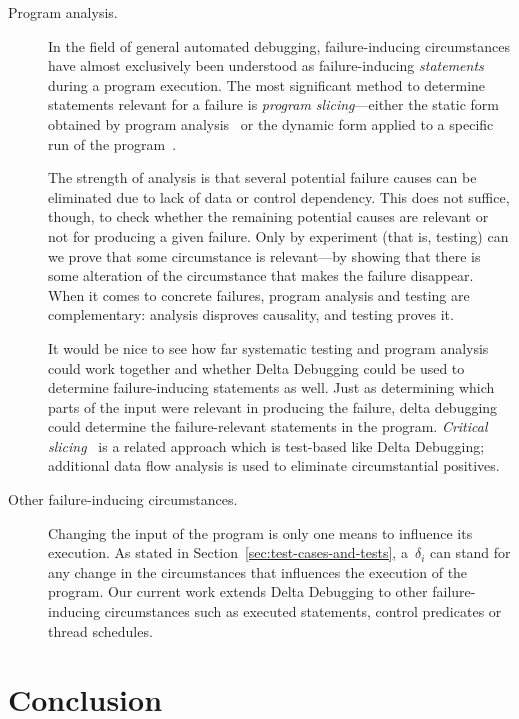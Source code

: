 \documentclass{acm_proc_article-sp}
\theoremstyle{plain}
\begin{document}
\begin{description}
\item[Program analysis.]  In the field of general automated debugging,
  failure-inducing circumstances have almost exclusively been
  understood as failure-inducing \emph{statements} during a program
  execution.  The most significant method to determine statements
  relevant for a failure is \emph{program slicing}---either the static
  form obtained by program analysis~\cite{weiser/82/cacm, tip/95/jpl}
  or the dynamic form applied to a specific run of the
  program~\cite{agrawal/horgan/90/pldi, gyimothy/etal/99/esec}.

  The strength of analysis is that several potential failure causes
  can be eliminated due to lack of data or control dependency.  This
  does not suffice, though, to check whether the remaining potential
  causes are relevant or not for producing a given failure.  Only by
  experiment (that is, testing) can we prove that some circumstance is
  relevant---by showing that there is some alteration of the
  circumstance that makes the failure disappear.  When it comes to
  concrete failures, program analysis and testing are complementary:
  analysis disproves causality, and testing proves it.

  It would be nice to see how far systematic testing and program
  analysis could work together and whether Delta Debugging could be
  used to determine failure-inducing statements as well.  Just as
  determining which parts of the input were relevant in producing the
  failure, delta debugging could determine the failure-relevant
  statements in the program.  \emph{Critical
    slicing}~\cite{demillo/pan/spafford/96/issta} is a related
  approach which is test-based like Delta Debugging; additional data
  flow analysis is used to eliminate circumstantial positives.

\item[Other failure-inducing circumstances.]  Changing the input of
  the program is only one means to influence its execution.  As stated
  in Section~\ref{sec:test-cases-and-tests}, a~$\delta_i$ can stand for any
  change in the circumstances that influences the execution of the
  program.  Our current work extends Delta Debugging to other
  failure-inducing circumstances such as executed statements, control
  predicates or thread schedules.
\end{description}


\section{Conclusion}
\label{sec:conclusion}
\end{document}
